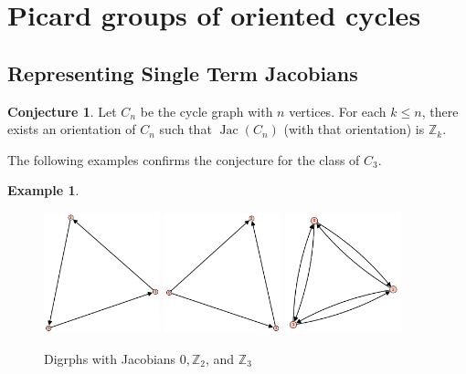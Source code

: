 \documentclass[11pt,reqno]{amsart}
\DeclareMathOperator{\Jac}{Jac}
\theoremstyle{definition}
\newtheorem{myeg}[mydef]{\textbf{Example}}
\newtheorem{conj}[mydef]{\textbf{Conjecture}}
\theoremstyle{plain}
\begin{document}
\section{Picard groups of oriented cycles}

	\subsection{Representing Single Term Jacobians}
		\begin{conj}
			Let $C_n$ be the cycle graph with $n$ vertices. For each $k \leq n$, there exists an orientation of $C_n$
			such that $\Jac(C_n)$ (with that orientation) is $\mathbb{Z}_k$.
		\end{conj}

		The following examples confirms the conjecture for the class of $C_3$.

		\begin{myeg}
		\begin{figure}[h!]
		\includegraphics[width=0.3\textwidth]{3-vertices1.PNG}
		\includegraphics[width=0.3\textwidth]{3-vertices2.PNG}
		\includegraphics[width=0.3\textwidth]{3-vertices3.PNG}
		\caption{Digrphs with Jacobians $0, \mathbb{Z}_2$, and $\mathbb{Z}_3$}
		\end{figure}


		\end{myeg}
\end{document}
